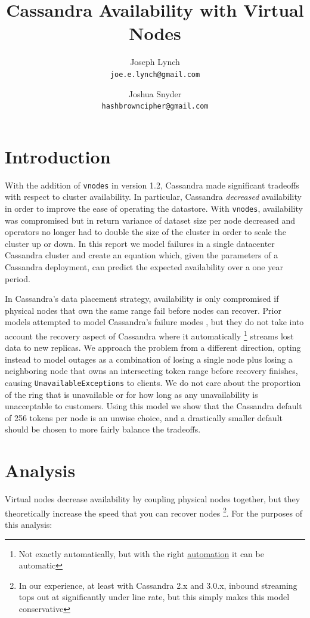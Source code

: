 \documentclass{article}
\title{Cassandra Availability with Virtual Nodes}
\author{
  Joseph Lynch\\
  \texttt{joe.e.lynch@gmail.com}
  \and
  Joshua Snyder\\
  \texttt{hashbrowncipher@gmail.com}
}
\begin{document}
\maketitle

\section{Introduction}
With the addition of \texttt{vnodes} \cite{vnodes} in version 1.2, Cassandra made significant tradeoffs with respect to cluster availability. In particular, Cassandra \textit{decreased} availability in order to improve the ease of operating the datastore. With \texttt{vnodes}, availability was compromised but in return variance of dataset size per node decreased and operators no longer had to double the size of the cluster in order to scale the cluster up or down. In this report we model failures in a single datacenter Cassandra cluster and create an equation which, given the parameters of a Cassandra deployment, can predict the expected availability over a one year period.

In Cassandra's data placement strategy, availability is only compromised if physical nodes that own the same range fail before nodes can recover. Prior models attempted to model Cassandra's failure modes \cite{dataloss}, but they do not take into account the recovery aspect of Cassandra where it automatically \footnote{Not exactly automatically, but with the right \href{https://github.com/Netflix/Priam}{automation} it can be automatic} streams lost data to new replicas. We approach the problem from a different direction, opting instead to model outages as a combination of losing a single node plus losing a neighboring node that owns an intersecting token range before recovery finishes, causing \texttt{UnavailableExceptions} to clients. We do not care about the proportion of the ring that is unavailable or for how long as any unavailability is unacceptable to customers. Using this model we show that the Cassandra default of 256 tokens per node is an unwise choice, and a drastically smaller default should be chosen to more fairly balance the tradeoffs.

\section{Analysis}
Virtual nodes decrease availability by coupling physical nodes together, but they theoretically increase the speed that you can recover nodes \footnote{In our experience, at least with Cassandra 2.x and 3.0.x, inbound streaming tops out at significantly under line rate, but this simply makes this model conservative}. For the purposes of this analysis:
\end{document}
